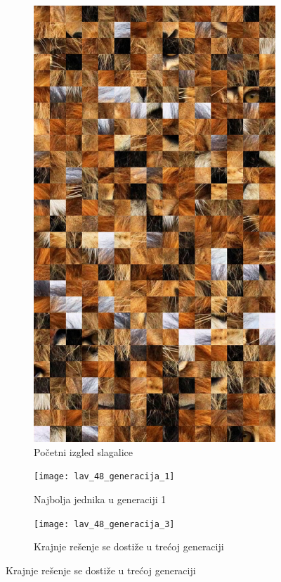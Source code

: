 \documentclass{article}
\begin{document}
\begin{figure}[h]
     \centering
	 \captionsetup{justification=centering}
     
     \begin{subfigure}[t]{0.3\textwidth}
         \centering
         \includegraphics[width=\textwidth]{lav_48_pocetak}
         \caption{{Početni izgled slagalice}}
         \label{fig:lav_48_pocetak}
     \end{subfigure}
     \hfill
     \begin{subfigure}[t]{0.3\textwidth}
         \centering
         \texttt{[image: lav\_48\_generacija\_1]}
         \caption{{Najbolja jednika u generaciji 1}}
         \label{fig:lav_48_generacija_1}
     \end{subfigure}
     \hfill
     \begin{subfigure}[t]{0.3\textwidth}
         \centering
         \texttt{[image: lav\_48\_generacija\_3]}
         \caption{{Krajnje rešenje se dostiže u trećoj generaciji}}
         \label{fig:lav_48_generacija_3}
     \end{subfigure}
     

\end{figure}
\end{document}
